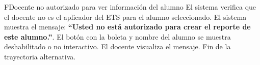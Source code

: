 \begin{UCtrayectoriaA}{F}{Docente no autorizado para ver información del alumno}
	\UCpaso El sistema verifica que el docente no es el aplicador del ETS para el alumno seleccionado.
	\UCpaso El sistema muestra el mensaje: \textbf{ ``Usted no está autorizado para crear el reporte de este alumno.''}.
	\UCpaso El botón con la boleta y nombre del alumno se muestra deshabilitado o no interactivo.
	\UCpaso[\UCactor] El docente visualiza el mensaje.
	\UCpaso Fin de la trayectoria alternativa.
\end{UCtrayectoriaA}

